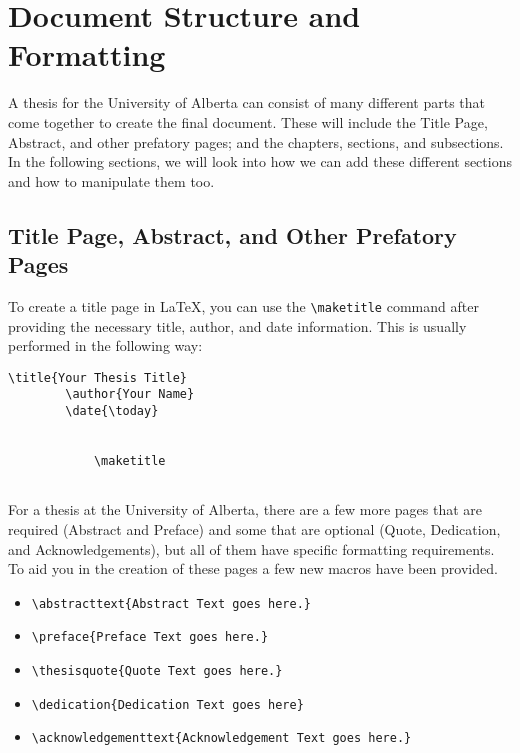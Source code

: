 \chapter{Document Structure and Formatting}
	A thesis for the University of Alberta can consist of many different parts that come together to create the final document.
	These will include the Title Page, Abstract, and other prefatory pages; and the chapters, sections, and subsections.
	In the following sections, we will look into how we can add these different sections and how to manipulate them too.
	
	\section{Title Page, Abstract, and Other Prefatory Pages}
		To create a title page in \LaTeX, you can use the \lstinline|\maketitle| command after providing the necessary title, author, and date information. 
		This is usually performed in the following way:

		\begin{lstlisting}[style=LaTeXStyle]
		\title{Your Thesis Title}
		\author{Your Name}
		\date{\today}

		
			\maketitle
		
		\end{lstlisting}

		For a thesis at the University of Alberta, there are a few more pages that are required (Abstract and Preface) and some that are optional (Quote, Dedication, and Acknowledgements), but all of them have specific formatting requirements.
		To aid you in the creation of these pages a few new macros have been provided.
		\begin{itemize}
			\item \lstinline|\abstracttext{Abstract Text goes here.}|
			\item \lstinline|\preface{Preface Text goes here.}|
			\item \lstinline|\thesisquote{Quote Text goes here.}|
			\item \lstinline|\dedication{Dedication Text goes here}|
			\item \lstinline|\acknowledgementtext{Acknowledgement Text goes here.}|
		\end{itemize}

